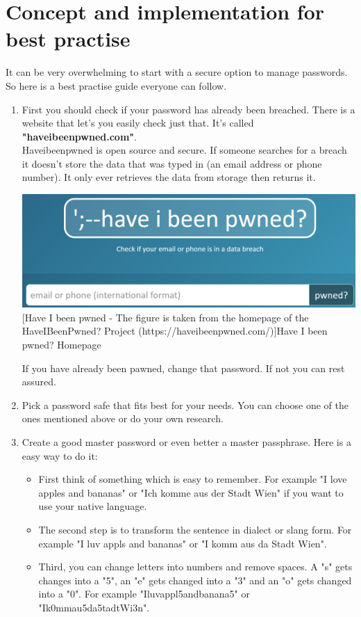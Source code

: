 \documentclass[conference]{IEEEtran}
\begin{document}
\section{Concept and implementation for best practise}
It can be very overwhelming to start with a secure option to manage passwords. So here is a best practise guide everyone can follow.
\begin{enumerate}
\item First you should check if your password has already been breached. There is a website that let's you easily check just that. It's called \textbf{"haveibeenpwned.com"}.\\
Haveibeenpwned is open source and secure. If someone searches for a breach it doesn't store the data that was typed in (an email address or phone number). It only ever retrieves the data from storage then returns it. \vspace{0.5cm}
\begin{center}
\includegraphics[scale=0.29]{./images/haveibeenpwned.png}
[Have I been pwned - The figure is taken from the homepage of the HaveIBeenPwned? Project (https://haveibeenpwned.com/)]{Have I been pwned? Homepage}
\end{center}
If you have already been pawned, change that password. If not you can rest assured. 
\item Pick a password safe that fits best for your needs. You can choose one of the ones mentioned above or do your own research.
\item Create a good master password or even better a master passphrase. Here is a easy way to do it: 
\begin{itemize}
\item First think of something which is easy to remember. For example "I love apples and bananas" or "Ich komme aus der Stadt Wien" if you want to use your native language.
\item The second step is to transform the sentence in dialect or slang form. For example "I luv appls and bananas" or "I komm aus da Stadt Wien".
\item Third, you can change letters into numbers and remove spaces. A "s" gets changes into a "5", an "e" gets changed into a "3" and an "o" gets changed into a "0". For example "Iluvappl5andbanana5" or "Ik0mmau5da5tadtWi3n".

\end{itemize}
\end{enumerate}
\end{document}
